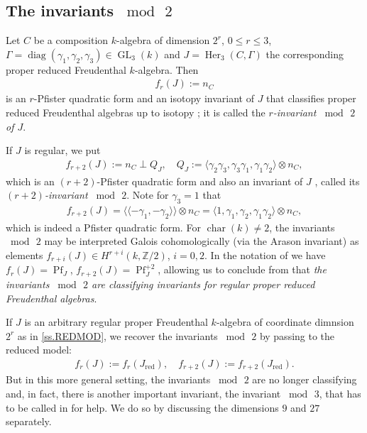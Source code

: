 \documentclass{amsart}
\theoremstyle{definition} %
\theoremstyle{remark} %
\DeclareMathOperator{\Pf}{Pf}
\DeclareMathOperator{\diag}{diag}
\DeclareMathOperator{\red}{red}
\newcommand{\ZZ}{\mathbb{Z}}
\newcommand{\IZ}{\ZZ}
\DeclareMathOperator{\ch}{char}
\newcommand{\la}{\langle}
\newcommand{\ra}{\rangle}
\newcommand{\dla}{\langle\langle}
\newcommand{\dra}{\rangle\rangle}
\renewcommand{\:}{\colon\,}
\DeclareMathOperator{\Her}{Her}
\DeclareMathOperator{\GL}{GL}
\numberwithin{equation}{section}
\begin{document}
\subsection{The invariants $\bmod\,2$} \label{ss.INMOTW} Let $C$ be a composition $k$-algebra of dimension $2^r$, $0 \le r\le 3$, $\Gamma = \diag(\gamma_1,\gamma_2,\gamma_3) \in \GL_3(k)$ and $J = \Her_3(C,\Gamma)$ the corresponding proper reduced Freudenthal $k$-algebra. Then
\begin{align}
\label{BOTINV} f_r(J) := n_C    
\end{align}
is an $r$-Pfister quadratic form and an isotopy invariant of $J$ that classifies proper reduced Freudenthal algebras up to isotopy \cite[Thm.~41.8]{MR4806163}; it is called the \emph{$r$-invariant $\bmod\,2$ of $J$}.

If $J$ is regular, we put
\begin{align}
\label{TOPINV} f_{r+2}(J) := n_C \perp Q_J, \quad Q_J := \la \gamma_2\gamma_3,\gamma_3\gamma_1,\gamma_1\gamma_2\ra \otimes n_C,  
\end{align}
which is an $(r+2)$-Pfister quadratic form and also an invariant of $J$ \cite[Lemma~41.7]{MR4806163}, called its \emph{$(r+2)$-invariant $\bmod\,2$}. Note for $\gamma_3 = 1$ that
\begin{align}
\label{TOPPFI} f_{r+2}(J) = \dla -\gamma_1,-\gamma_2\dra \otimes n_C = \la 1,\gamma_1,\gamma_2,\gamma_1\gamma_2\ra \otimes n_C,  
\end{align}
which is indeed a Pfister quadratic form. For $\ch(k) \ne 2$, the invariants $\bmod\,2$ may be interpreted
Galois cohomologically (via the Arason invariant) as elements $f_{r+i}(J) \in H^{r+i}(k,\IZ/2)$, $i = 0,2$. In the notation of \cite[41.11]{MR4806163} we have $f_r(J) = \Pf_J$, $f_{r+2}(J) = \Pf_J^{+2}$, allowing us to conclude from \cite[Thm.~41.21]{MR4806163} that \emph{the invariants $\bmod\,2$ are classifying invariants for regular proper reduced Freudenthal algebras}.

If $J$ is an arbitrary regular proper Freudenthal $k$-algebra of coordinate dimnsion $2^r$ as in \ref{ss.REDMOD}, we recover the invariants $\bmod\,2$ by passing to the reduced model:
\begin{align}
\label{JAYRET} f_r(J) := f_r(J_{\red}), \quad f_{r+2}(J) := f_{r+2}(J_{\red}).  
\end{align}
But in this more general setting, the invariants $\bmod\,2$ are no longer classifying and, in fact, there is another important invariant, the invariant $\bmod\,3$, that has to be called in for help. We do so by discussing the dimensions $9$ and $27$ separately.
\end{document}
